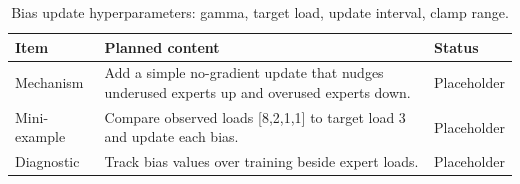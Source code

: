 \begin{table}[H]
\centering
\caption{Bias update hyperparameters: gamma, target load, update interval, clamp range.}
\label{tab:ch09-dynamic-bias-update-from-expert-load}
\begin{tabularx}{\textwidth}{p{}X p{}}
\toprule
Item & Planned content & Status \\
\midrule
Mechanism & Add a simple no-gradient update that nudges underused experts up and overused experts down. & Placeholder \\
Mini-example & Compare observed loads [8,2,1,1] to target load 3 and update each bias. & Placeholder \\
Diagnostic & Track bias values over training beside expert loads. & Placeholder \\
\bottomrule
\end{tabularx}
\end{table}
